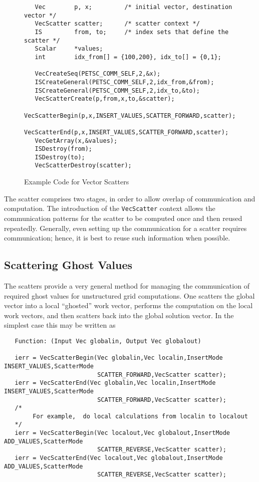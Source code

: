 \begin{figure}[tb]
\begin{verbatim}
   Vec        p, x;         /* initial vector, destination vector */
   VecScatter scatter;      /* scatter context */
   IS         from, to;     /* index sets that define the scatter */
   Scalar     *values;
   int        idx_from[] = {100,200}, idx_to[] = {0,1};

   VecCreateSeq(PETSC_COMM_SELF,2,&x);
   ISCreateGeneral(PETSC_COMM_SELF,2,idx_from,&from);
   ISCreateGeneral(PETSC_COMM_SELF,2,idx_to,&to);
   VecScatterCreate(p,from,x,to,&scatter);
   VecScatterBegin(p,x,INSERT_VALUES,SCATTER_FORWARD,scatter);
   VecScatterEnd(p,x,INSERT_VALUES,SCATTER_FORWARD,scatter);
   VecGetArray(x,&values);
   ISDestroy(from);
   ISDestroy(to); 
   VecScatterDestroy(scatter);
\end{verbatim}
\caption{Example Code for Vector Scatters}
\label{fig:vecscatter}
\end{figure}

The scatter comprises two stages, in order to allow overlap of 
communication and computation. The introduction of the 
{\tt VecScatter} context allows the communication patterns for the scatter
to be computed once and then reused repeatedly. Generally, even 
setting up the communication for a scatter requires communication; 
hence, it is best to reuse such information when possible.

\subsection{Scattering Ghost Values}

The scatters provide a very general method for managing the communication of 
required ghost values for unstructured grid computations. One scatters
the global vector into a local ``ghosted'' work vector, performs the computation
on the local work vectors, and then scatters back into the global solution 
vector. In the simplest case this may be written as
\begin{verbatim}
   Function: (Input Vec globalin, Output Vec globalout)

   ierr = VecScatterBegin(Vec globalin,Vec localin,InsertMode INSERT_VALUES,ScatterMode
                          SCATTER_FORWARD,VecScatter scatter);
   ierr = VecScatterEnd(Vec globalin,Vec localin,InsertMode INSERT_VALUES,ScatterMode
                          SCATTER_FORWARD,VecScatter scatter);
   /*
        For example,  do local calculations from localin to localout 
   */
   ierr = VecScatterBegin(Vec localout,Vec globalout,InsertMode ADD_VALUES,ScatterMode
                          SCATTER_REVERSE,VecScatter scatter);
   ierr = VecScatterEnd(Vec localout,Vec globalout,InsertMode ADD_VALUES,ScatterMode
                          SCATTER_REVERSE,VecScatter scatter);
\end{verbatim}

